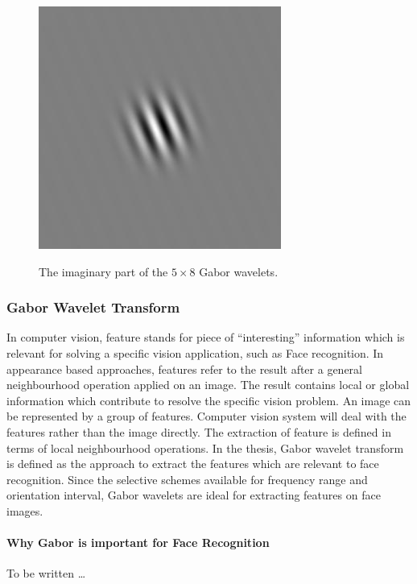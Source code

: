 \begin{figure}
\begin{center}
 \includegraphics[scale=0.1]{ch4/figures/iGabor4_7.jpg}\\
\end{center}
\caption{The imaginary part of the $5\times8$ Gabor wavelets.}
\label{fig:imaggabor}
\end{figure} 

\subsubsection{Gabor Wavelet Transform}
In computer vision, feature stands for piece of ``interesting'' information which is relevant for solving a specific vision application, such as Face recognition. In appearance based approaches, features refer to the result after a general neighbourhood operation applied on an image. The result contains local or global information which contribute to resolve the specific vision problem. An image can be represented by a group of features.  Computer vision system will deal with the features rather than the image directly. 
The extraction of feature is  defined in terms of local neighbourhood operations. In the thesis, Gabor wavelet transform is defined as the approach to extract the features which are relevant to face recognition. Since the selective schemes available for frequency range and orientation interval, Gabor wavelets are ideal for extracting features on face images. 
\paragraph{Why Gabor is important for Face Recognition}
To be written \ldots



